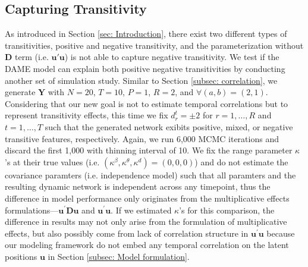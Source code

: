 \documentclass[a4paper]{article}
\begin{document}
\subsection{Capturing Transitivity} \label{subsec: negative transitivity}
As introduced in Section \ref{sec: Introduction}, there exist two different types of transitivities, positive and negative transitivity, and the parameterization without $\mathbf{D}$ term (i.e. $\boldsymbol{u}'\boldsymbol{u}$) is not able to capture negative transitivity. We test if the DAME model can explain both positive negative transitivities by conducting another set of simulation study. Similar to Section \ref{subsec: correlation}, we generate $\mathbf{Y}$ with $N=20$, $T=10$, $P=1$, $R=2$, and $\forall (a, b) = (2, 1)$. Considering that our new goal is not to estimate temporal correlations but to represent transitivity effects, this time we fix $d^t_{r} = \pm 2$ for $r=1,\ldots, R$ and $t=1,\ldots,T$ such that the generated network exibits positive, mixed, or negative transitive features, respectively. Again, we run 6,000 MCMC iterations and discard the first 1,000 with thinning interval of 10. We fix the range parameter $\kappa$'s at their true values (i.e. $(\kappa^\beta, \kappa^\theta, \kappa^d) = (0, 0, 0)$) and do not estimate the covariance paramters (i.e. independence model) such that all paramters and the resulting dynamic network is independent across any timepoint, thus the difference in model performance only originates from the multiplicative effects formulations---$\boldsymbol{u}^\prime \mathbf{D}\boldsymbol{u}$ and $\boldsymbol{u}^\prime \boldsymbol{u}$. If we estimated $\kappa$'s for this comparison, the difference in results may not only arise from the formulation of multiplicative effects, but also possibly come from lack of correlation structure in $\boldsymbol{u}^\prime\boldsymbol{u}$ because our modeling framework do not embed any temporal correlation on the latent positions $\boldsymbol{u}$ in Section \ref{subsec: Model formulation}.   \\ \newline 
\end{document}
